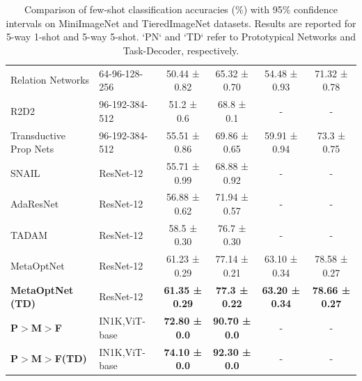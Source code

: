 \begin{table}[!htbp]
{\begin{tabular}{ll|cccc}
    Relation Networks\cite{sung2017learning}      & 64-96-128-256      & 50.44 ± 0.82                     & 65.32 ± 0.70                         & 54.48 ± 0.93                         & 71.32 ± 0.78                         \\
    R2D2\cite{bertinetto2018meta}        & 96-192-384-512     & 51.2 ± 0.6                       & 68.8 ± 0.1                           & -                                    & -                                    \\
    Transductive Prop Nets\cite{liu2018learning} & 96-192-384-512     & 55.51 ± 0.86                     & 69.86 ± 0.65                         & 59.91 ± 0.94                         & 73.3 ± 0.75                          \\
    SNAIL\cite{mishra2017simple}         & ResNet-12          & 55.71 ± 0.99                     & 68.88 ± 0.92                         & -                                    & -                                    \\
    AdaResNet\cite{munkhdalai2018rapid} & ResNet-12          & 56.88 ± 0.62                     & 71.94 ± 0.57                         & -                                    & -                                    \\
    TADAM\cite{oreshkin2018tadam2}      & ResNet-12          & 58.5 ± 0.30                      & 76.7 ± 0.30                          & -                                    & -                                    \\
    MetaOptNet                   & ResNet-12          & 61.23 ± 0.29                     & 77.14 ± 0.21                         & 63.10 ± 0.34                         & 78.58 ± 0.27                         \\
    \textbf{MetaOptNet (TD)}     & ResNet-12          & \textbf{61.35 ± 0.29}            & \textbf{77.3 ± 0.22}                 & \textbf{63.20 ± 0.34}                & \textbf{78.66 ± 0.27}                \\
    \textbf{P$>$M$>$F}           & IN1K,ViT-base       & \textbf{72.80 ± 0.0}             & \textbf{90.70 ± 0.0}                 & -                                    & -                                    \\
    \textbf{P$>$M$>$F(TD)}       & IN1K,ViT-base       & \textbf{74.10 ± 0.0}             & \textbf{92.30 ± 0.0}                 & -                                    & -                                    \\
    \hline
    \end{tabular}}
    \caption{Comparison of few-shot classification accuracies (\%) with 95\% confidence intervals on MiniImageNet and TieredImageNet datasets. Results are reported for 5-way 1-shot and 5-way 5-shot. `PN` and `TD` refer to Prototypical Networks and Task-Decoder, respectively.}
    \label{table:1}
  \end{table}


